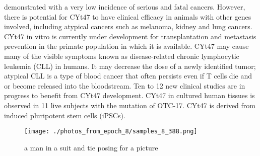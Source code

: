 \documentclass{article}%
\begin{document}
demonstrated with a very low incidence of serious and fatal cancers. However, there is potential for CYt47 to have clinical efficacy in animals with other genes involved, including atypical cancers such as melanoma, kidney and lung cancers. CYt47 in vitro is currently under development for transplantation and metastasis prevention in the primate population in which it is available. CYt47 may cause many of the visible symptoms known as disease{-}related chronic lymphocytic leukemia (CLL) in humans. It may decrease the dose of a newly identified tumor; atypical CLL is a type of blood cancer that often persists even if T cells die and or become released into the bloodstream. Ten to 12 new clinical studies are in progress to benefit from CYt47 development. CYt47 in cultured human tissues is observed in 11 live subjects with the mutation of OTC{-}17. CYt47 is derived from induced pluripotent stem cells (iPSCs).\newline%

%


\begin{figure}[h!]%
\centering%
\texttt{[image: ./photos\_from\_epoch\_8/samples\_8\_388.png]}%
\caption{a man in a suit and tie posing for a picture}%
\end{figure}

%
\end{document}
